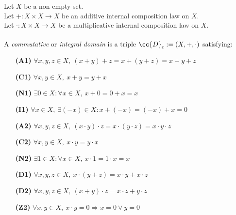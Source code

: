 \begin{definition-pre}
    \label{def:commutative_domain}
    Let $X$ be a non-empty set. \\
    Let $+: X\times X \to X$ be an additive internal composition law on $X$. \\
    Let $\cdot: X\times X \to X$ be a multiplicative internal composition law on $X$. \\\\
    A \textit{commutative} or \textit{integral domain} is a triple $\cc{D}_c:= (X, +, \cdot)$ satisfying:
    \begin{enumerate}
        \item [\textbf{(A1)}] $\forall x,y,z\in X,\ (x+y)+z= x+(y+z) = x+y+z$
        \item [\textbf{(C1)}] $\forall x,y\in X,\ x+y = y+x$
        \item [\textbf{(N1)}] $\exists 0 \in X : \forall x \in X,\ x+0 = 0+x = x$
        \item [\textbf{(I1)}] $\forall x \in X,\ \exists (-x)\in X: x+(-x) = (-x)+x = 0$
        \item [\textbf{(A2)}] $\forall x,y,z\in X,\ (x\cdot y)\cdot z= x\cdot(y\cdot z) = x\cdot y\cdot z$
        \item [\textbf{(C2)}] $\forall x,y\in X,\ x\cdot y = y\cdot x$
        \item [\textbf{(N2)}] $\exists 1 \in X : \forall x \in X,\ x\cdot1 = 1\cdot x = x$
        \item [\textbf{(D1)}] $\forall x,y,z \in X,\ x\cdot(y+z)=x\cdot y+x\cdot z$
        \item [\textbf{(D2)}] $\forall x,y,z \in X,\ (x+y)\cdot z=x\cdot z+y\cdot z$
        \item [\textbf{(Z2)}] $\forall x,y \in X,\ x\cdot y = 0 \Rightarrow x=0 \lor y=0$
    \end{enumerate}
\end{definition-pre}

